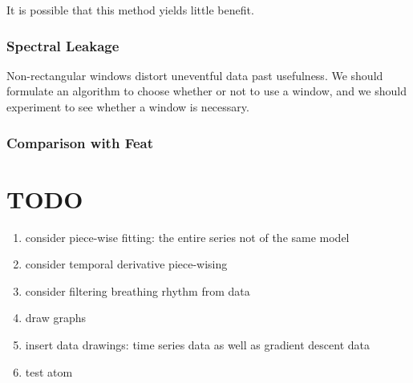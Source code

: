 \documentclass{article}
\begin{document}
It is possible that this method yields little benefit.

\subsubsection*{Spectral Leakage}
Non-rectangular windows distort uneventful data past usefulness. We should formulate an algorithm to choose whether or not to use a window, and we should experiment to see whether a window is necessary.
\subsubsection*{Comparison with Feat}







\section*{TODO}
\begin{enumerate}
    \item consider piece-wise fitting: the entire series not of the same model
    \item consider temporal derivative piece-wising
    \item consider filtering breathing rhythm from data
    \item draw graphs
    \item insert data drawings: time series data as well as gradient descent data
    \item test atom
\end{enumerate}
\end{document}

